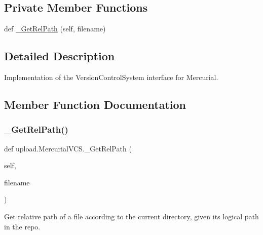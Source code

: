\subsection*{Private Member Functions}
\begin{DoxyCompactItemize}
\item 
def \mbox{\hyperlink{classupload_1_1_mercurial_v_c_s_a140da653b63106c4fa825f3ef5bf7701}{\+\_\+\+Get\+Rel\+Path}} (self, filename)
\end{DoxyCompactItemize}


\subsection{Detailed Description}
\begin{DoxyVerb}Implementation of the VersionControlSystem interface for Mercurial.\end{DoxyVerb}
 

\subsection{Member Function Documentation}
\mbox{\label{classupload_1_1_mercurial_v_c_s_a140da653b63106c4fa825f3ef5bf7701}} 
\subsubsection{\texorpdfstring{\+\_\+\+Get\+Rel\+Path()}{\_GetRelPath()}}
{\footnotesize\ttfamily def upload.\+Mercurial\+V\+C\+S.\+\_\+\+Get\+Rel\+Path (\begin{DoxyParamCaption}\item[{}]{self,  }\item[{}]{filename }\end{DoxyParamCaption})\hspace{0.3cm}{\ttfamily [private]}}

\begin{DoxyVerb}Get relative path of a file according to the current directory,
given its logical path in the repo.\end{DoxyVerb}
 \mbox{\label{classupload_1_1_mercurial_v_c_s_a6190899fb86cd09ad84cc5d4b0ebd2f3}} 
